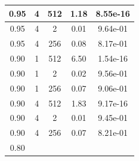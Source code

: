\documentclass{../myclass}
\begin{document}
\begin{table}[ht]
\begin{tabular}{ccccc}
    \\ \hline
    \multicolumn{1}{|c|}{0.95}                                                              &
    \multicolumn{1}{c|}{4}     & \multicolumn{1}{c|}{512}
    & \multicolumn{1}{c|}{1.18}         & \multicolumn{1}{c|}{8.55e-16}
    \\ \hline
    \multicolumn{1}{|c|}{0.95}                                                              &
    \multicolumn{1}{c|}{4}     & \multicolumn{1}{c|}{2}
    & \multicolumn{1}{c|}{0.01}         & \multicolumn{1}{c|}{9.64e-01}
    \\ \hline
    \multicolumn{1}{|c|}{0.95}                                                              &
    \multicolumn{1}{c|}{4}     & \multicolumn{1}{c|}{256}
    & \multicolumn{1}{c|}{0.08}         & \multicolumn{1}{c|}{8.17e-01}
    \\ \hline
    \multicolumn{1}{|c|}{0.90}                                                              &
    \multicolumn{1}{c|}{1}     & \multicolumn{1}{c|}{512}
    & \multicolumn{1}{c|}{6.50}         & \multicolumn{1}{c|}{1.54e-16}
    \\ \hline
    \multicolumn{1}{|c|}{0.90}                                                              &
    \multicolumn{1}{c|}{1}     & \multicolumn{1}{c|}{2}
    & \multicolumn{1}{c|}{0.02}         & \multicolumn{1}{c|}{9.56e-01}
    \\ \hline
    \multicolumn{1}{|c|}{0.90}                                                              &
    \multicolumn{1}{c|}{1}     & \multicolumn{1}{c|}{256}
    & \multicolumn{1}{c|}{0.07}         & \multicolumn{1}{c|}{9.06e-01}
    \\ \hline
    \multicolumn{1}{|c|}{0.90}                                                              &
    \multicolumn{1}{c|}{4}     & \multicolumn{1}{c|}{512}
    & \multicolumn{1}{c|}{1.83}         & \multicolumn{1}{c|}{9.17e-16}
    \\ \hline
    \multicolumn{1}{|c|}{0.90}                                                              &
    \multicolumn{1}{c|}{4}     & \multicolumn{1}{c|}{2}
    & \multicolumn{1}{c|}{0.01}         & \multicolumn{1}{c|}{9.45e-01}
    \\ \hline
    \multicolumn{1}{|c|}{0.90}                                                              &
    \multicolumn{1}{c|}{4}     & \multicolumn{1}{c|}{256}
    & \multicolumn{1}{c|}{0.07}         & \multicolumn{1}{c|}{8.21e-01}
    \\ \hline
    \multicolumn{1}{|c|}{0.80}                                                              &

\end{tabular}
\end{table}
\end{document}
